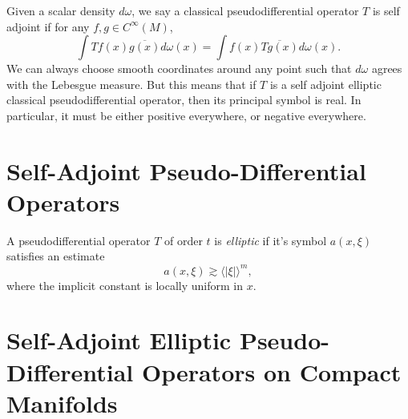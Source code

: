 Given a scalar density $d\omega$, we say a classical pseudodifferential operator $T$ is self adjoint if for any $f,g \in C^\infty(M)$,
%
\[ \int Tf(x) \overline{g(x)} d\omega(x) = \int f(x) \overline{Tg(x)} d\omega(x). \]
%
We can always choose smooth coordinates around any point such that $d\omega$ agrees with the Lebesgue measure. But this means that if $T$ is a self adjoint elliptic classical pseudodifferential operator, then its principal symbol is real. In particular, it must be either positive everywhere, or negative everywhere.




\section{Self-Adjoint Pseudo-Differential Operators}

A pseudodifferential operator $T$ of order $t$ is \emph{elliptic} if it's symbol $a(x,\xi)$ satisfies an estimate
%
\[ a(x,\xi) \gtrsim \langle |\xi| \rangle^m, \]
%
where the implicit constant is locally uniform in $x$.









\section{Self-Adjoint Elliptic Pseudo-Differential Operators on Compact Manifolds}

